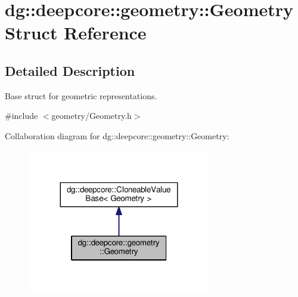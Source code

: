 \hypertarget{structdg_1_1deepcore_1_1geometry_1_1_geometry}{}\section{dg\+:\+:deepcore\+:\+:geometry\+:\+:Geometry Struct Reference}
\label{structdg_1_1deepcore_1_1geometry_1_1_geometry}


\subsection{Detailed Description}
Base struct for geometric representations. 

{\ttfamily \#include $<$geometry/\+Geometry.\+h$>$}



Collaboration diagram for dg\+:\+:deepcore\+:\+:geometry\+:\+:Geometry\+:
\nopagebreak
\begin{figure}[H]
\begin{center}
\leavevmode
\includegraphics[width=227pt]{structdg_1_1deepcore_1_1geometry_1_1_geometry__coll__graph}
\end{center}
\end{figure}

